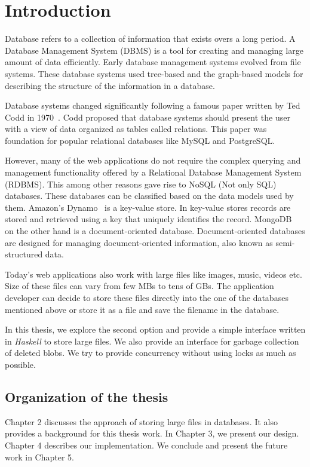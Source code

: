 \chapter{Introduction}
\label{chap:intro}

Database refers to a collection of information that exists overs a long period.
A Database Management System (DBMS) is a tool for creating and managing large amount of data efficiently.
Early database management systems evolved from file systems. These database systems used tree-based and the graph-based models for describing the structure of the information in a database.

Database systems changed significantly following a famous paper written by Ted Codd in 1970~\cite{codd1970relational}. Codd proposed that database systems should present the user with a view of data organized as tables called relations. This paper was foundation for popular relational databases like MySQL and PostgreSQL.

However, many of the web applications do not require the complex querying and management functionality offered by a Relational Database Management System (RDBMS). This among other reasons gave rise to NoSQL (Not only SQL) databases. These databases can be classified based on the data models used by them. Amazon's Dynamo~\cite{decandia2007dynamo} is a key-value store. In key-value stores records are stored and retrieved using a key that uniquely identifies the record.
MongoDB~\cite{chodorow2013mongodb} on the other hand is a document-oriented database. Document-oriented databases are designed for managing document-oriented information, also known as semi-structured data.

Today's web applications also work with large files like images, music, videos etc. Size of these files can vary from few MBs to tens of GBs. The application developer can decide to store these files directly into the one of the databases mentioned above or store it as a file and save the filename in the database.

In this thesis, we explore the second option and provide a simple interface written in \textit{Haskell} to store large files. We also provide an interface for garbage collection of deleted blobs. We try to provide concurrency without using locks as much as possible.

\section{Organization of the thesis}
Chapter 2 discusses the approach of storing large files in databases. It also provides a background for this thesis work. In Chapter 3, we present our design. Chapter 4 describes our implementation. We conclude and present the future work in Chapter 5.
